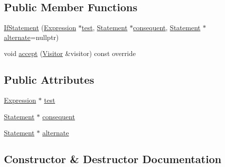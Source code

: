 \subsection*{Public Member Functions}
\begin{DoxyCompactItemize}
\item 
\hyperlink{structast_1_1_if_statement_adab903b8789a25744b1607ded9dca1d2}{If\+Statement} (\hyperlink{structast_1_1_expression}{Expression} $\ast$\hyperlink{structast_1_1_if_statement_ad339145ed98fc65452bc7339f737a790}{test}, \hyperlink{structast_1_1_statement}{Statement} $\ast$\hyperlink{structast_1_1_if_statement_a2a02f92cb28fb4847ea286341c1c0270}{consequent}, \hyperlink{structast_1_1_statement}{Statement} $\ast$\hyperlink{structast_1_1_if_statement_a2f84078dbbe4d3246609c13c526fc69d}{alternate}=nullptr)
\item 
void \hyperlink{structast_1_1_if_statement_ab4053b9564cf00687f8f1351dd8044cb}{accept} (\hyperlink{structast_1_1_visitor}{Visitor} \&visitor) const override
\end{DoxyCompactItemize}
\subsection*{Public Attributes}
\begin{DoxyCompactItemize}
\item 
\hyperlink{structast_1_1_expression}{Expression} $\ast$ \hyperlink{structast_1_1_if_statement_ad339145ed98fc65452bc7339f737a790}{test}
\item 
\hyperlink{structast_1_1_statement}{Statement} $\ast$ \hyperlink{structast_1_1_if_statement_a2a02f92cb28fb4847ea286341c1c0270}{consequent}
\item 
\hyperlink{structast_1_1_statement}{Statement} $\ast$ \hyperlink{structast_1_1_if_statement_a2f84078dbbe4d3246609c13c526fc69d}{alternate}
\end{DoxyCompactItemize}


\subsection{Constructor \& Destructor Documentation}
\mbox{\label{structast_1_1_if_statement_adab903b8789a25744b1607ded9dca1d2}} 
